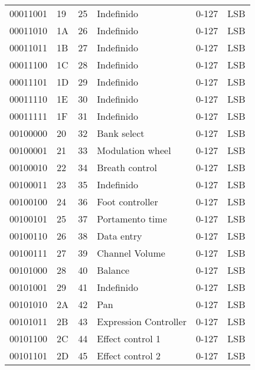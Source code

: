 \begin{center}
\begin{supertabular}{| C{2cm} | C{1.5cm} | C{1.5cm} | C{5.3cm} | C{1.5cm} | C{1.5cm} |}
                00011001 & 19 & 25  & Indefinido & 0-127 & LSB \\
             00011010 & 1A & 26  & Indefinido & 0-127 & LSB \\
                00011011 & 1B & 27  & Indefinido & 0-127 & LSB \\
             00011100 & 1C & 28  & Indefinido & 0-127 & LSB \\
                00011101 & 1D & 29  & Indefinido & 0-127 & LSB \\
             00011110 & 1E & 30  & Indefinido & 0-127 & LSB \\
                00011111 & 1F & 31  & Indefinido & 0-127 & LSB \\
             00100000 & 20 & 32  & Bank select & 0-127 & LSB \\
                00100001 & 21 & 33  & Modulation wheel & 0-127 & LSB \\
             00100010 & 22 & 34  & Breath control & 0-127 & LSB \\
                00100011 & 23 & 35  & Indefinido & 0-127 & LSB \\
             00100100 & 24 & 36  & Foot controller & 0-127 & LSB \\
                00100101 & 25 & 37  & Portamento time & 0-127 & LSB \\
             00100110 & 26 & 38  & Data entry & 0-127 & LSB \\
                00100111 & 27 & 39  & Channel Volume & 0-127 & LSB \\
             00101000 & 28 & 40  & Balance & 0-127 & LSB \\
                00101001 & 29 & 41  & Indefinido & 0-127 & LSB \\
             00101010 & 2A & 42  & Pan & 0-127 & LSB \\
                00101011 & 2B & 43  & Expression Controller & 0-127 & LSB \\
             00101100 & 2C & 44  & Effect control 1 & 0-127 & LSB \\
                00101101 & 2D & 45  & Effect control 2 & 0-127 & LSB \\

\end{supertabular}
\end{center}
